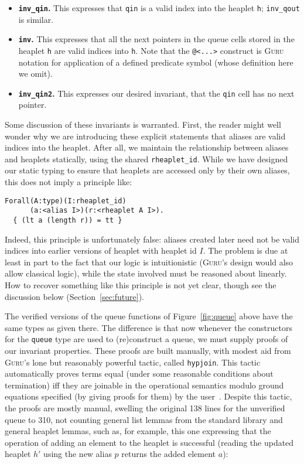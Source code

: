 \documentclass[9pt,natbib]{sigplanconf}
\begin{document}
\begin{itemize}
\item \textbf{\texttt{inv\_qin}.}  This expresses that \texttt{qin} is
a valid index into the heaplet \texttt{h}; \texttt{inv\_qout} is similar.
\item \textbf{\texttt{inv}.} This expresses that all the next pointers
  in the queue cells stored in the heaplet \texttt{h} are valid
  indices into \texttt{h}.  Note that the \texttt{@<...>} construct is
  \textsc{Guru} notation for application of a defined predicate symbol
  (whose definition here we omit).
\item \textbf{\texttt{inv\_qin2}.} This expresses our desired
  invariant, that the \texttt{qin} cell has no next pointer.
\end{itemize}

\noindent Some discussion of these invariants is warranted.  First,
the reader might well wonder why we are introducing these explicit
statements that aliases are valid indices into the heaplet.  After
all, we maintain the relationship between aliases and heaplets
statically, using the shared \texttt{rheaplet\_id}.  
While we have designed our static typing to ensure that heaplets
are accessed only by their own aliases, this does not imply a principle like:

{\small
\begin{verbatim}
Forall(A:type)(I:rheaplet_id)
      (a:<alias I>)(r:<rheaplet A I>).
  { (lt a (length r)) = tt }
\end{verbatim}
}

\noindent Indeed, this principle is unfortunately false: aliases
created later need not be valid indices into earlier versions of
heaplet with heaplet id $I$.  The problem is due at least in part to
the fact that our logic is intuitionistic (\textsc{Guru}'s design
would also allow classical logic), while the state involved must be
reasoned about linearly.  How to recover something like this principle
is not yet clear, though see the discussion below
(Section~\ref{sec:future}).

The verified versions of the queue functions of Figure~\ref{fig:queue}
above have the same types as given there.  The difference is that now
whenever the constructors for the \texttt{queue} type are used to
(re)construct a queue, we must supply proofs of our invariant
properties.  These proofs are built manually, with modest aid from
\textsc{Guru}'s lone but reasonably powerful tactic, called
\texttt{hypjoin}.  This tactic automatically proves terms equal (under
some reasonable conditions about termination) iff they are joinable in
the operational semantics modulo ground equations specified (by giving
proofs for them) by the user~\cite{petcher09,petcher08}.  Despite this
tactic, the proofs are mostly manual, swelling the original 138 lines
for the unverified queue to 310, not counting general list lemmas from
the standard library and general heaplet lemmas, such as, for example,
this one expressing that the operation of adding an element to the
heaplet is successful (reading the updated heaplet $h'$ using the new
alias $p$ returns the added element $a$):
\end{document}

